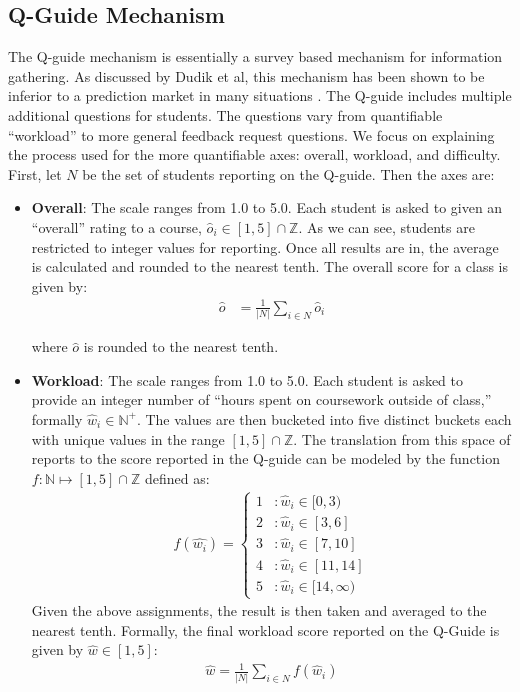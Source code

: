 \subsection{Q-Guide Mechanism}
The Q-guide mechanism is essentially a survey based mechanism for information gathering. As discussed by Dudik et al, this mechanism has been shown to be inferior to a prediction market in many situations \cite{dudik}. The Q-guide includes multiple additional questions for students. The questions vary from quantifiable ``workload'' to more general feedback request questions. We focus on explaining the process used for the more quantifiable axes: overall, workload, and difficulty. First, let $N$ be the set of students reporting on the Q-guide. Then the axes are:
\begin{itemize}
\item \textbf{Overall}: The scale ranges from 1.0 to 5.0. Each student is asked to given an ``overall'' rating to a course, $\hat{o}_i \in [1,5]\cap \mathbb{Z}$. As we can see, students are restricted to integer values for reporting. Once all results are in, the average is calculated and rounded to the nearest tenth. The overall score for a class is given by:
\begin{align}
\hat{o} &= \frac{1}{|N|}\sum_{i \in N}\hat{o}_i
\end{align}

where $\hat{o}$ is rounded to the nearest tenth.
\item \textbf{Workload}: The scale ranges from 1.0 to 5.0. Each student is asked to provide an integer number of ``hours spent on coursework outside of class,'' formally $\hat{w}_i \in \mathbb{N}^+$. The values are then bucketed into five distinct buckets each with unique values in the range $[1,5] \cap \mathbb{Z}$. The translation from this space of reports to the score reported in the Q-guide can be modeled by the function $f: \mathbb{N} \mapsto [1,5] \cap \mathbb{Z}$ defined as:
\begin{align}
f(\hat{w_i}) = \left\{
     \begin{array}{lr}
       1 & : \hat{w}_i \in [0, 3) \\
       2 & : \hat{w}_i \in [3, 6]  \\
       3 & :  \hat{w}_i \in [7, 10] \\
       4 & : \hat{w}_i \in [11, 14] \\
       5 & : \hat{w}_i \in [14,\infty) 
     \end{array}
   \right.
\end{align}
Given the above assignments, the result is then taken and averaged to the nearest tenth. Formally, the final workload score reported on the Q-Guide is given by $\hat{w} \in [1,5]$:
\begin{align}
\hat{w} = \frac{1}{|N|}\sum_{i \in N} f(\hat{w}_i)
\end{align}


\end{itemize}
